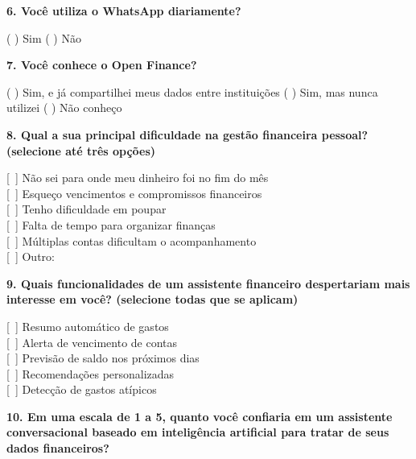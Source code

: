 \vspace{10pt}

\textbf{6. Você utiliza o WhatsApp diariamente?}

\vspace{4pt}
( ) Sim \quad ( ) Não

\vspace{10pt}

\textbf{7. Você conhece o Open Finance?}

\vspace{4pt}
( ) Sim, e já compartilhei meus dados entre instituições \quad ( ) Sim, mas nunca utilizei \quad ( ) Não conheço

\vspace{10pt}

\textbf{8. Qual a sua principal dificuldade na gestão financeira pessoal? (selecione até três opções)}

\vspace{4pt}
{[~]} Não sei para onde meu dinheiro foi no fim do mês\\
{[~]} Esqueço vencimentos e compromissos financeiros\\
{[~]} Tenho dificuldade em poupar\\
{[~]} Falta de tempo para organizar finanças\\
{[~]} Múltiplas contas dificultam o acompanhamento\\
{[~]} Outro: \underline{\hspace{5cm}}

\vspace{10pt}

\textbf{9. Quais funcionalidades de um assistente financeiro despertariam mais interesse em você? (selecione todas que se aplicam)}

\vspace{4pt}
{[~]} Resumo automático de gastos\\
{[~]} Alerta de vencimento de contas\\
{[~]} Previsão de saldo nos próximos dias\\
{[~]} Recomendações personalizadas\\
{[~]} Detecção de gastos atípicos

\vspace{10pt}

\newpage

\textbf{10. Em uma escala de 1 a 5, quanto você confiaria em um assistente conversacional baseado em inteligência artificial para tratar de seus dados financeiros?}

